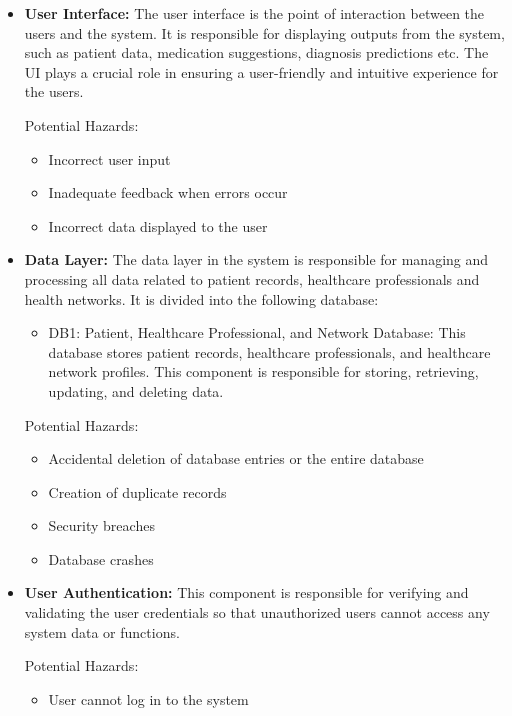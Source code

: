 \documentclass{article}
\begin{document}
\begin{itemize}
 
    \item \textbf{User Interface:}
    The user interface is the point of interaction between the users and the system. It is responsible for displaying outputs from the system, such as patient data, medication suggestions, diagnosis predictions etc. The UI plays a crucial role in ensuring a user-friendly and intuitive experience for the users.
    
    Potential Hazards:
    \begin{itemize}
        \item Incorrect user input
        \item Inadequate feedback when errors occur
        \item Incorrect data displayed to the user
    \end{itemize}

    \item \textbf{Data Layer:}
    The data layer in the system is responsible for managing and processing all data related to patient records, healthcare professionals and health networks. It is divided into the following database:
    \begin{itemize}
        \item DB1: Patient, Healthcare Professional, and Network Database: This database stores patient records, healthcare professionals, and healthcare network profiles. This component is responsible for storing, retrieving, updating, and deleting data. 
    \end{itemize}

    Potential Hazards:
    \begin{itemize}
        \item Accidental deletion of database entries or the entire database
        \item Creation of duplicate records
        \item Security breaches
        \item Database crashes   
    \end{itemize}
    
    \item \textbf{User Authentication:}
    This component is responsible for verifying and validating the user credentials so that unauthorized users cannot access any system data or functions. 
    
    Potential Hazards:
    \begin{itemize}
        \item User cannot log in to the system
    \end{itemize}
    

\end{itemize}
\end{document}
